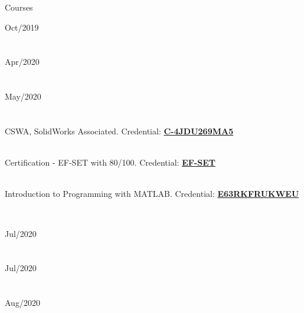 \documentclass[10pt]{article}
\begin{document}
\begin{LARGE}
        \color{blue!50!black} Courses\par
\end{LARGE}
    
\begin{multicols}{2}
    \begin{vwcol}[widths={0.235,0.765},
 sep=.8cm,rule=0pt,indent=0em,lines=9]
        \hspace{5pt}Oct/2019\\
        \hfill\\
        \hfill\\
        \hspace{5pt}Apr/2020\\
        \hfill\\
        \hfill\\
        \hspace{5pt}May/2020\\
        \hfill\\
        \hfill\\
        CSWA, SolidWorks Associated. Credential: \href{https://cv.virtualtester.com/qr/?b=SLDWRKS&i=C-4JDU269MA5}{\textbf{C-4JDU269MA5}}\par\hfill\\
        Certification - EF-SET with 80/100. Credential: \href{https://www.efset.org/cert/oZC3oZ}{\textbf{EF-SET}}\par\hfill\\
        Introduction to Programming with MATLAB. Credential: \href{https://www.coursera.org/account/accomplishments/verify/E63RKFRUKWEU}{\textbf{E63RKFRUKWEU}}\par\hfill\\
    \end{vwcol}
    \columnbreak
    \begin{vwcol}[widths={0.235,0.765}, sep=.8cm,rule=0pt,indent=0em,lines=9]
        \hspace{5pt}Jul/2020\\
        \hfill\\
        \hfill\\
        \hspace{5pt}Jul/2020\\
        \hfill\\
        \hfill\\
        \hspace{5pt}Aug/2020\\
        \hfill\\
        \hfill\\

\end{vwcol}
\end{multicols}
\end{document}
